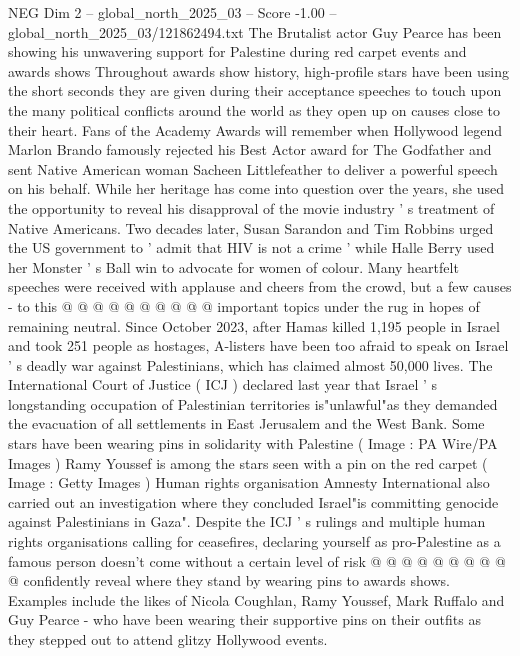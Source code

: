 \begin{textsample}{NEG Dim 2 – global\_north\_2025\_03 – Score -1.00 – global\_north\_2025\_03/121862494.txt}  \label{ex:f2_neg_025}
The Brutalist actor Guy Pearce has been showing his unwavering support for Palestine during red carpet events and awards shows Throughout awards show history, high-profile stars have been using the short seconds they are given during their acceptance speeches to touch upon the many political conflicts around the world as they open up on causes close to their heart.
Fans of the Academy Awards will remember when Hollywood legend Marlon Brando famously rejected his Best Actor award for The Godfather and sent Native American woman Sacheen Littlefeather to deliver a powerful speech on his behalf.
While her heritage has come into question over the years, she used the opportunity to reveal his disapproval of the movie industry ' s treatment of Native Americans.
Two decades later, Susan Sarandon and Tim Robbins urged the US government to ' admit that HIV is not a crime ' while Halle Berry used her Monster ' s Ball win to advocate for women of colour.
Many heartfelt speeches were received with applause and cheers from the crowd, but a few causes - to this @ @ @ @ @ @ @ @ @ @ important topics under the rug in hopes of remaining neutral.
Since October 2023, after Hamas killed 1,195 people in Israel and took 251 people as hostages, A-listers have been too afraid to speak on Israel ' s deadly war against Palestinians, which has claimed almost 50,000 lives.
The International Court of Justice ( ICJ ) declared last year that Israel ' s longstanding occupation of Palestinian territories is"unlawful"as they demanded the evacuation of all settlements in East Jerusalem and the West Bank.
Some stars have been wearing pins in solidarity with Palestine ( Image : PA Wire/PA Images ) Ramy Youssef is among the stars seen with a pin on the red carpet ( Image : Getty Images ) Human rights organisation Amnesty International also carried out an investigation where they concluded Israel"is committing genocide against Palestinians in Gaza".
Despite the ICJ ' s rulings and multiple human rights organisations calling for ceasefires, declaring yourself as pro-Palestine as a famous person doesn't come without a certain level of risk @ @ @ @ @ @ @ @ @ @ confidently reveal where they stand by wearing pins to awards shows.
Examples include the likes of Nicola Coughlan, Ramy Youssef, Mark Ruffalo and Guy Pearce - who have been wearing their supportive pins on their outfits as they stepped out to attend glitzy Hollywood events.

\end{textsample}

